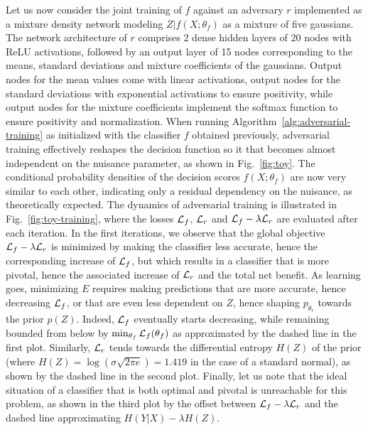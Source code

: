 \documentclass{article}
\theoremstyle{plain}
\begin{document}
Let us now consider the joint training of $f$ against an adversary $r$
implemented as a mixture density network modeling $Z|f(X;\theta_f)$ as a mixture
of five gaussians. The network architecture of $r$ comprises 2
dense hidden layers of 20 nodes with ReLU activations, followed by an
output layer of 15 nodes corresponding to the means, standard deviations and
mixture coefficients of the gaussians. Output nodes for the mean values
come with linear activations, output nodes for the standard deviations with
exponential activations to ensure positivity, while output nodes for the mixture
coefficients implement the softmax function to ensure positivity and
normalization. When running Algorithm~\ref{alg:adversarial-training} as
initialized with the classifier $f$ obtained previously, adversarial training
effectively reshapes the decision function so it that becomes almost independent
on the nuisance parameter, as shown in Fig.~\ref{fig:toy}. The
conditional probability densities of the decision scores $f(X;\theta_f)$ are now
very similar to each other, indicating only a residual  dependency on the
nuisance, as theoretically expected. The dynamics of adversarial training is
illustrated in Fig.~\ref{fig:toy-training}, where the losses ${\cal L}_f$,
${\cal L}_r$ and ${\cal L}_f - \lambda {\cal L}_r$ are evaluated after each
iteration. In the first iterations,
we observe that the global objective ${\cal L}_f - \lambda {\cal L}_r$ is
minimized by making the classifier less accurate, hence the corresponding
increase of ${\cal L}_f$, but which results in a classifier that is more
pivotal, hence the associated increase of ${\cal L}_r$ and the total net
benefit. As learning goes, minimizing $E$ requires making predictions that
are more accurate, hence decreasing ${\cal L}_f$, or that are even less
dependent on $Z$, hence shaping $p_{\theta_r}$ towards the prior $p(Z)$. Indeed,
${\cal L}_f$ eventually starts decreasing, while remaining bounded from below by
$\min_{\theta_f} {\cal L}_f(\theta_f)$ as approximated by the dashed line in the
first plot. Similarly,  ${\cal L}_r$ tends towards the differential entropy
$H(Z)$ of the prior (where $H(Z) = \log(\sigma \sqrt{2 \pi e}) = 1.419$ in the
case of a standard normal), as shown by the dashed line in the
second plot. Finally, let us note that the ideal situation of a classifier that
is both optimal and pivotal is unreachable for this problem, as shown
in the third plot by the  offset between ${\cal L}_f - \lambda {\cal L}_r$ and
the dashed line approximating $H({Y|X}) - \lambda H(Z)$.
\end{document}
